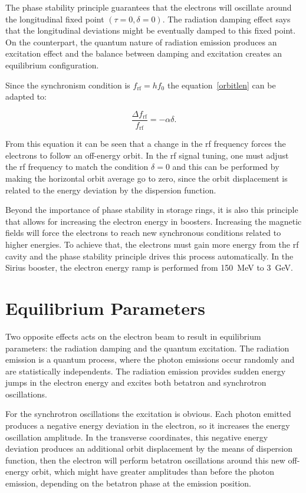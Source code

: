 The phase stability principle guarantees that the electrons will oscillate around the longitudinal fixed point $(\tau = 0, \delta = 0)$. The radiation damping effect says that the longitudinal deviations might be eventually damped to this fixed point. On the counterpart, the quantum nature of radiation emission produces an excitation effect and the balance between damping and excitation creates an equilibrium configuration.

Since the synchronism condition is $f_{\mathrm{rf}} = h f_0$ the equation~\eqref{orbitlen} can be adapted to:

\begin{equation}
    \dfrac{\Delta f_{\mathrm{rf}}}{f_{\mathrm{rf}}} = -\alpha \delta.
    \label{eq:delta_freq}
\end{equation}

From this equation it can be seen that a change in the \gls{rf} frequency forces the electrons to follow an off-energy orbit. In the \gls{rf} signal tuning, one must adjust the \gls{rf} frequency to match the condition $\delta = 0$ and this can be performed by making the horizontal orbit average go to zero, since the orbit displacement is related to the energy deviation by the dispersion function.

Beyond the importance of phase stability in storage rings, it is also this principle that allows for increasing the electron energy in boosters. Increasing the magnetic fields will force the electrons to reach new synchronous conditions related to higher energies. To achieve that, the electrons must gain more energy from the \gls{rf} cavity and the phase stability principle drives this process automatically. In the Sirius booster, the electron energy ramp is performed from \SI{150}{\mega \electronvolt} to \SI{3}{\giga \electronvolt}.

\section{Equilibrium Parameters}\label{equilibrium}

Two opposite effects acts on the electron beam to result in equilibrium parameters: the radiation damping and the quantum excitation. The radiation emission is a quantum process, where the photon emissions occur randomly and are statistically independents. The radiation emission provides sudden energy jumps in the electron energy and excites both betatron and synchrotron oscillations.

For the synchrotron oscillations the excitation is obvious. Each photon emitted produces a negative energy deviation in the electron, so it increases the energy oscillation amplitude. In the transverse coordinates, this negative energy deviation produces an additional orbit displacement by the means of dispersion function, then the electron will perform betatron oscillations around this new off-energy orbit, which might have greater amplitudes than before the photon emission, depending on the betatron phase at the emission position.

